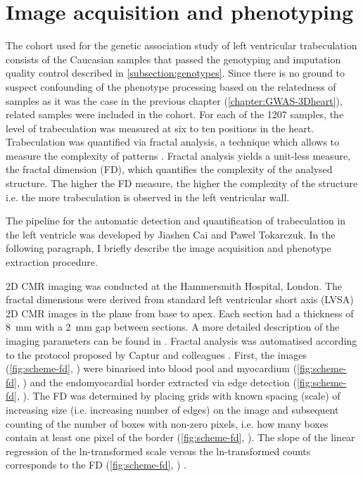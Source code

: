 \section{Image acquisition and phenotyping}
The cohort used for the genetic association study of left ventricular trabeculation consists of the Caucasian samples that passed the genotyping and imputation quality control described in \cref{subsection:genotypes}. Since there is no ground to suspect confounding of the phenotype processing based on the relatedness of samples as it was the case in the previous chapter (\cref{chapter:GWAS-3Dheart}), related samples were included in the cohort. For each of the \num{1207} samples, the level of trabeculation was measured at six to ten positions in the heart. Trabeculation was quantified via fractal analysis, a technique which allows to measure the complexity of patterns \citep{Eke2002}. Fractal analysis yields a unit-less measure, the fractal dimension (FD), which quantifies the complexity of the analysed structure. The higher the FD measure, the higher the complexity of the structure i.e. the more trabeculation is observed in the left ventricular wall. 

The pipeline for the automatic detection and quantification of trabeculation in the left ventricle was developed by Jiashen Cai and Pawel Tokarczuk. In the following paragraph, I briefly describe the image acquisition and phenotype extraction procedure. 

2D CMR imaging was conducted at the Hammersmith Hospital, London. The fractal dimensions were derived from standard left ventricular short axis (LVSA) 2D CMR images in the plane from base to apex. Each section had a thickness of \num{8}~mm with a \num{2}~mm gap between sections. A more detailed description of the imaging parameters can be found in \citep{deMarvao2014}. Fractal analysis was automatised according to the protocol proposed by Captur and colleagues \citeyearpar{Captur2013}. First, the images (\cref{fig:scheme-fd}, ) were binarised into blood pool and myocardium (\cref{fig:scheme-fd}, ) and the endomyocardial border extracted via edge detection (\cref{fig:scheme-fd}, ). The FD was determined by placing grids with known spacing (scale) of increasing size (i.e. increasing number of edges) on the image and subsequent counting of the number of boxes with non-zero pixels, i.e. how many boxes contain at least one pixel of the border (\cref{fig:scheme-fd}, ). The slope of the linear regression of the ln-transformed scale versus the ln-transformed counts corresponds to the FD (\cref{fig:scheme-fd}, ) \citep{Captur2013}.

